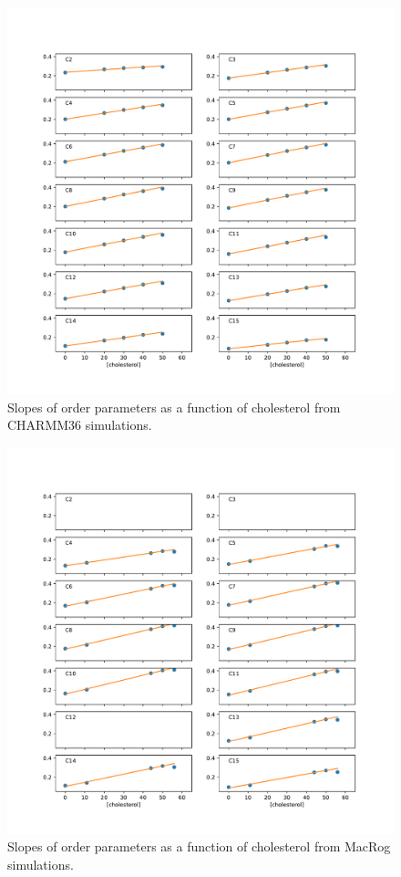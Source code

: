 \documentclass[journal=jpcbfk]{achemso}
\begin{document}
 \begin{figure}[]
  \centering
  \includegraphics[width=19cm]{../FIGS/slopesCHARMM.pdf}
  \caption{\label{slopescharmm}
    Slopes of order parameters as a function of cholesterol from CHARMM36 simulations.
  }
\end{figure}
 \begin{figure}[]
  \centering
  \includegraphics[width=19cm]{../FIGS/slopesMACROG.pdf}
  \caption{\label{slopesmacrog}
    Slopes of order parameters as a function of cholesterol from MacRog simulations.
  }
\end{figure}
\end{document}
